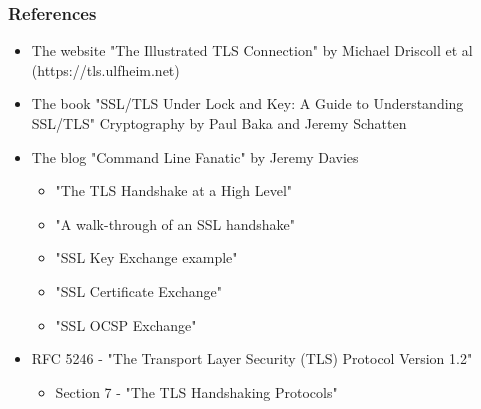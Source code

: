 \documentclass[aspectratio=169]{beamer}
\begin{document}
\begin{frame}
	\frametitle{References}
	\begin{itemize}
		\item The website "The Illustrated TLS Connection" by Michael Driscoll et al (https://tls.ulfheim.net)
		\item The book "SSL/TLS Under Lock and Key: A Guide to Understanding SSL/TLS" Cryptography by Paul Baka and Jeremy Schatten
		\item The blog "Command Line Fanatic" by Jeremy Davies
		\begin{itemize}
			\item "The TLS Handshake at a High Level"
			\item "A walk-through of an SSL handshake"
			\item "SSL Key Exchange example"
			\item "SSL Certificate Exchange"
			\item "SSL OCSP Exchange"
		\end{itemize}		
		\item RFC 5246 - "The Transport Layer Security (TLS) Protocol Version 1.2"
		\begin{itemize}
			\item Section 7 - "The TLS Handshaking Protocols"
		\end{itemize}
	\end{itemize}
\end{frame}
\end{document}
